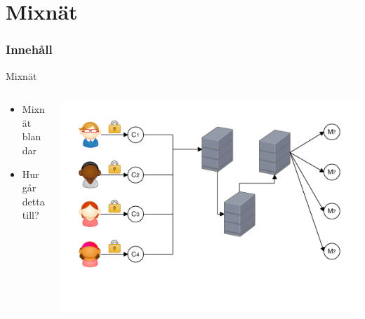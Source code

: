 \section{Mixnät}
\begin{frame}
\frametitle{Innehåll}
\tableofcontents[currentsection]
\end{frame}

\begin{frame}{Mixnät}

\begin{columns}
    \begin{column}{0.4\textwidth}
        \begin{itemize}
        	\item Mixnät blandar
        	\item Hur går detta till?
        \end{itemize}
    \end{column}
	\begin{column}{0.6\textwidth}
    	\includegraphics[width=\textwidth]{images/mix1.pdf}
	\end{column}
\end{columns}

\end{frame}

